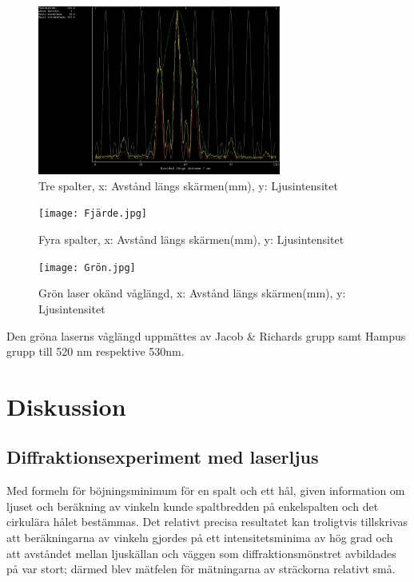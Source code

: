 \documentclass[conference]{IEEEtran}
\begin{document}
\begin{figure}[H]
    \begin{center}
        \includegraphics[width = 8cm]{Tredje.jpg}
    \end{center}
    \caption{Tre spalter, x: Avstånd längs skärmen(mm), y: Ljusintensitet}
    \label{3 spalter}
\end{figure} \vspace{3pt}

\begin{figure}[H]
    \begin{center}
        \texttt{[image: Fjärde.jpg]}
    \end{center}
    \caption{Fyra spalter, x: Avstånd längs skärmen(mm), y: Ljusintensitet}
    \label{4 spalter}
\end{figure} \vspace{3pt}

\begin{figure}[H]
    \begin{center}
        \texttt{[image: Grön.jpg]}
    \end{center}
    \caption{Grön laser okänd våglängd, x: Avstånd längs skärmen(mm), y: Ljusintensitet}
    \label{Grön laser}
\end{figure} \vspace{3pt}
Den gröna laserns våglängd uppmättes av Jacob \& Richards grupp samt Hampus grupp till 520 nm respektive 530nm. 


\section{Diskussion}

\subsection{Diffraktionsexperiment med laserljus}
Med formeln för böjningsminimum för en spalt och ett hål, given information om ljuset och beräkning av vinkeln kunde spaltbredden på enkelspalten och det cirkulära hålet bestämmas. Det relativt precisa resultatet kan troligtvis tillskrivas att beräkningarna av vinkeln gjordes på ett intensitetsminima av hög grad och att avståndet mellan ljuskällan och väggen som diffraktionsmönstret avbildades på var stort; därmed blev mätfelen för mätningarna av sträckorna relativt små. 
\end{document}
